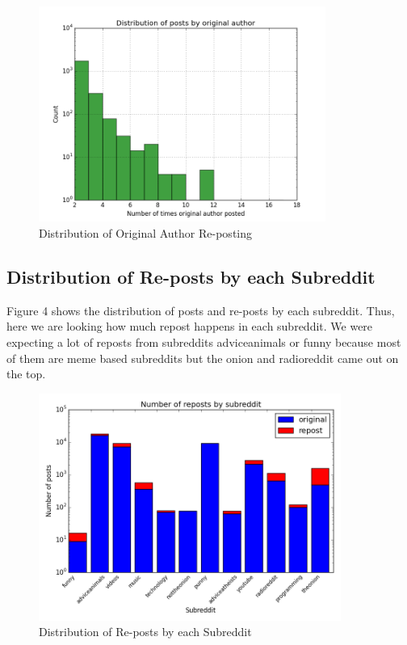 \documentclass{article} %
\begin{document}
\begin{figure}[h]
\begin{center}
\includegraphics[width=3.7in]{original_author.png}
\caption{Distribution of Original Author Re-posting}
\end{center}
\end{figure}

\newpage

\subsection{Distribution of Re-posts by each Subreddit}

Figure 4 shows the distribution of posts and re-posts by each subreddit. Thus, here we are looking how much repost happens in each subreddit. We were expecting a lot of reposts from subreddits adviceanimals or funny because most of them are meme based subreddits but the onion and radioreddit came out on the top. 

\begin{figure}[h]
\begin{center}
\includegraphics[width=3.9in]{reposts.png}
\caption{Distribution of Re-posts by each Subreddit}
\end{center}
\end{figure}
\end{document}

